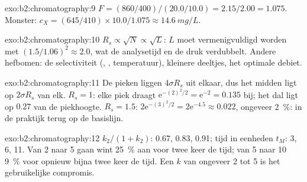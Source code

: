 \begin{solution}{exo:b2:chromatography:9}
$F = (860/400)/(20.0/10.0) = 2.15/2.00 = 1.075$. Monster: $c_X = (645/410) \times 10.0/1.075 \approx
\qty{14.6}{mg/L}$.
\end{solution}

\begin{solution}{exo:b2:chromatography:10}
$R_s \propto \sqrt N \propto \sqrt L$: $L$ moet vermenigvuldigd worden met $(1.5/1.06)^2 \approx 2.0$, wat de
analysetijd en de druk verdubbelt. Andere hefbomen: de selectiviteit (, ,
temperatuur), kleinere deeltjes, het optimale debiet.
\end{solution}

\begin{solution}{exo:b2:chromatography:11}
De pieken liggen $4\sigma R_s$ uit elkaar, dus het midden ligt op $2\sigma R_s$ van elk. $R_s = 1$: elke piek
draagt $\mathrm e^{-(2)^2/2} = \mathrm e^{-2} = 0.135$ bij; het dal ligt op $0.27$ van de piekhoogte.
$R_s = 1.5$: $2\mathrm e^{-(3)^2/2} = 2\mathrm e^{-4.5} \approx 0.022$, ongeveer 2~\%: in de praktijk terug op de basislijn.
\end{solution}

\begin{solution}{exo:b2:chromatography:12}
$k_2/(1+k_2)$: 0.67, 0.83, 0.91; tijd in eenheden $t_M$: 3, 6, 11. Van 2 naar 5 gaan wint 25~\% aan
 voor twee keer de tijd; van 5 naar 10 9~\% voor opnieuw bijna twee keer de tijd. Een $k$ van ongeveer 2 tot 5 is
het gebruikelijke compromis.
\end{solution}

